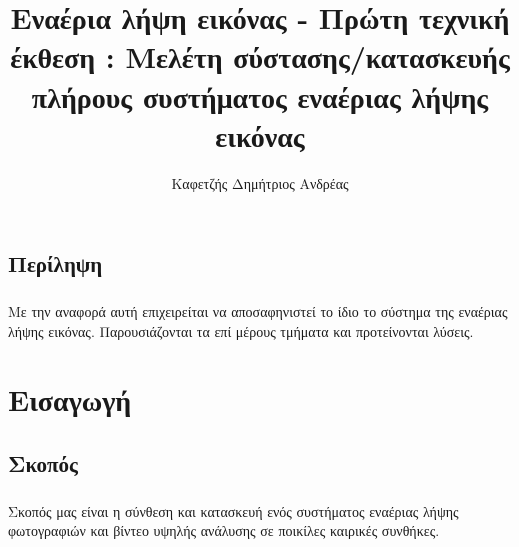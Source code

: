 \documentclass[a4paper, 12pt, twoside]{report}
\author{Καφετζής Δημήτριος Ανδρέας}
\title{Εναέρια λήψη εικόνας - Πρώτη τεχνική έκθεση : Μελέτη σύστασης/κατασκευής πλήρους συστήματος εναέριας λήψης εικόνας}
\begin{document}
	
	\maketitle
	
	\section*{Περίληψη}
		\paragraph{}{Με την αναφορά αυτή επιχειρείται να αποσαφηνιστεί το ίδιο το σύστημα της εναέριας λήψης εικόνας. Παρουσιάζονται τα επί μέρους τμήματα και προτείνονται λύσεις.
		}
		
	\tableofcontents

	\newpage
	\listoffigures

	\newpage
	\listoftables
	
	\makeatletter
		\def\cleardoublepage{
			\clearpage\if@twoside \ifodd\c@page\else
	    	\hbox{}
	    	\thispagestyle{plain}
	    	\newpage
    		\if@twocolumn\hbox{}\newpage\fi\fi\fi
    	}
	\makeatother \clearpage{\pagestyle{plain}\cleardoublepage}

	\pagestyle{fancy}
	\fancyhf{}
	\renewcommand{\chaptermark}[1]{\markboth{ \emph{#1}}{}}

	\fancyhead[RE]{\leftmark}
	\fancyfoot[LE,RO]{\thepage}
	
	\chapter{Εισαγωγή}
		
		\section{Σκοπός}
			\paragraph{}{Σκοπός μας είναι η σύνθεση και κατασκευή ενός συστήματος εναέριας λήψης φωτογραφιών και βίντεο υψηλής ανάλυσης σε ποικίλες καιρικές συνθήκες.
			}
			
\end{document}
